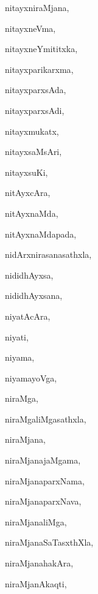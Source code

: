 \begin{multicols}{3}
{\noindent
{nitayxniraMjana}, \pageref{nitayxniraMjana}

\noindent
{nitayxneVma}, \pageref{nitayxneVma}

\noindent
{nitayxneYmititxka}, \pageref{nitayxneYmititxka}

\noindent
{nitayxparikarxma}, \pageref{nitayxparikarxma}

\noindent
{nitayxparxsAda}, \pageref{nitayxparxsAda}

\noindent
{nitayxparxsAdi}, \pageref{nitayxparxsAdi}

\noindent
{nitayxmukatx}, \pageref{nitayxmukatx}

\noindent
{nitayxsaMsAri}, \pageref{nitayxsaMsAri}

\noindent
{nitayxsuKi}, \pageref{nitayxsuKi}

\noindent
{nitAyxcAra}, \pageref{nitAyxcAra}

\noindent
{nitAyxnaMda}, \pageref{nitAyxnaMda}

\noindent
{nitAyxnaMdapada}, \pageref{nitAyxnaMdapada}

\noindent
{nidArxnirasanasathxla}, \pageref{nidArxnirasanasathxla}

\noindent
{nididhAyxsa}, \pageref{nididhAyxsa}

\noindent
{nididhAyxsana}, \pageref{nididhAyxsana}

\noindent
{niyatAcAra}, \pageref{niyatAcAra}

\noindent
{niyati}, \pageref{niyati}

\noindent
{niyama}, \pageref{niyama}

\noindent
{niyamayoVga}, \pageref{niyamayoVga}

\noindent
{niraMga}, \pageref{niraMga}

\noindent
{niraMgaliMgasathxla}, \pageref{niraMgaliMgasathxla}

\noindent
{niraMjana}, \pageref{niraMjana}

\noindent
{niraMjanajaMgama}, \pageref{niraMjanajaMgama}

\noindent
{niraMjanaparxNama}, \pageref{niraMjanaparxNama}

\noindent
{niraMjanaparxNava}, \pageref{niraMjanaparxNava}

\noindent
{niraMjanaliMga}, \pageref{niraMjanaliMga}

\noindent
{niraMjanaSaTasxthXla}, \pageref{niraMjanaSaTasxthXla}

\noindent
{niraMjanahakAra}, \pageref{niraMjanahakAra}

\noindent
{niraMjanAkaqti}, \pageref{niraMjanAkaqti}

}
\end{multicols}
